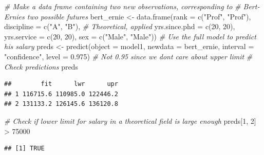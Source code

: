 \documentclass[
]{article}
\newenvironment{Shaded}{\begin{snugshade}}{\end{snugshade}}
\newcommand{\AttributeTok}[1]{\textcolor[rgb]{0.77,0.63,0.00}{#1}}
\newcommand{\CommentTok}[1]{\textcolor[rgb]{0.56,0.35,0.01}{\textit{#1}}}
\newcommand{\DecValTok}[1]{\textcolor[rgb]{0.00,0.00,0.81}{#1}}
\newcommand{\FloatTok}[1]{\textcolor[rgb]{0.00,0.00,0.81}{#1}}
\newcommand{\FunctionTok}[1]{\textcolor[rgb]{0.00,0.00,0.00}{#1}}
\newcommand{\NormalTok}[1]{#1}
\newcommand{\OtherTok}[1]{\textcolor[rgb]{0.56,0.35,0.01}{#1}}
\newcommand{\SpecialCharTok}[1]{\textcolor[rgb]{0.00,0.00,0.00}{#1}}
\newcommand{\StringTok}[1]{\textcolor[rgb]{0.31,0.60,0.02}{#1}}
\begin{document}
\begin{Shaded}
\begin{Highlighting}[]
\CommentTok{\# Make a data frame containing two new observations, corresponding to}
\CommentTok{\# Bert{-}Ernie\textquotesingle{}s two possible futures}
\NormalTok{bert\_ernie }\OtherTok{\textless{}{-}} \FunctionTok{data.frame}\NormalTok{(}\AttributeTok{rank =} \FunctionTok{c}\NormalTok{(}\StringTok{"Prof"}\NormalTok{, }\StringTok{"Prof"}\NormalTok{),}
                         \AttributeTok{discipline =} \FunctionTok{c}\NormalTok{(}\StringTok{"A"}\NormalTok{, }\StringTok{"B"}\NormalTok{), }\CommentTok{\# Theoretical, applied}
                         \AttributeTok{yrs.since.phd =} \FunctionTok{c}\NormalTok{(}\DecValTok{20}\NormalTok{, }\DecValTok{20}\NormalTok{),}
                         \AttributeTok{yrs.service =} \FunctionTok{c}\NormalTok{(}\DecValTok{20}\NormalTok{, }\DecValTok{20}\NormalTok{),}
                         \AttributeTok{sex =} \FunctionTok{c}\NormalTok{(}\StringTok{"Male"}\NormalTok{, }\StringTok{"Male"}\NormalTok{))}
\CommentTok{\# Use the full model to predict his salary}
\NormalTok{preds }\OtherTok{\textless{}{-}} \FunctionTok{predict}\NormalTok{(}\AttributeTok{object =}\NormalTok{ model1,}
                 \AttributeTok{newdata =}\NormalTok{ bert\_ernie,}
                 \AttributeTok{interval =} \StringTok{"confidence"}\NormalTok{,}
                 \AttributeTok{level =} \FloatTok{0.975}\NormalTok{) }\CommentTok{\# Not 0.95 since we don\textquotesingle{}t care about upper limit}
\CommentTok{\# Check predictions}
\NormalTok{preds}
\end{Highlighting}
\end{Shaded}

\begin{verbatim}
##        fit      lwr      upr
## 1 116715.6 110985.0 122446.2
## 2 131133.2 126145.6 136120.8
\end{verbatim}

\begin{Shaded}
\begin{Highlighting}[]
\CommentTok{\# Check if lower limit for salary in a theoretical field is large enough}
\NormalTok{preds[}\DecValTok{1}\NormalTok{, }\DecValTok{2}\NormalTok{] }\SpecialCharTok{\textgreater{}} \DecValTok{75000}
\end{Highlighting}
\end{Shaded}

\begin{verbatim}
## [1] TRUE
\end{verbatim}
\end{document}
